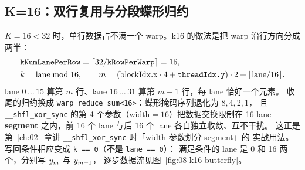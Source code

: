 \subsection{K=16：双行复用与分段蝶形归约}

$K = 16 < 32$ 时，单行数据占不满一个 warp。k16 的做法是把 warp 沿行方向分成两半：
\begin{equation}
\begin{aligned}
  &\texttt{k\allowbreak{}Num\allowbreak{}Lane\allowbreak{}Per\allowbreak{}Row} = \lceil 32 / \texttt{kRowPerWarp} \rceil = 16, \\
  &k = \mathrm{lane} \bmod 16, \qquad
  m = (\mathrm{blockIdx.x} \cdot 4 + \texttt{threadIdx.y}) \cdot 2 + \lfloor \mathrm{lane} / 16 \rfloor .
\end{aligned}
\label{eq:8-k16-map}
\end{equation}
lane $0\,\dots\,15$ 算第 $m$ 行、lane $16\,\dots\,31$ 算第 $m+1$ 行，每 lane 恰好一个元素。
收尾的归约换成 \texttt{warp\_\allowbreak{}reduce\_\allowbreak{}sum\allowbreak{}<16>}：蝶形掩码序列退化为 $8, 4, 2, 1$，
且 \texttt{\_\allowbreak{}\_\allowbreak{}shfl\_\allowbreak{}xor\_\allowbreak{}sync} 的第 4 个参数（width$=16$）把数据交换限制在
16-lane \textbf{segment} 之内，前 16 个 lane 与后 16 个 lane 各自独立收敛、互不干扰。
这正是第~\ref{ch:02}~章讲 \texttt{\_\allowbreak{}\_\allowbreak{}shfl\_\allowbreak{}xor\_\allowbreak{}sync} 时「width 参数划分 segment」的
实战用法。写回条件相应变成 \texttt{k == 0}（\textbf{不是} \texttt{lane == 0}）：
满足条件的 lane 是 0 和 16 两个，分别写 $y\sb{m}$ 与 $y\sb{m+1}$，
逐步数据流见图~\ref{fig:08-k16-butterfly}。

